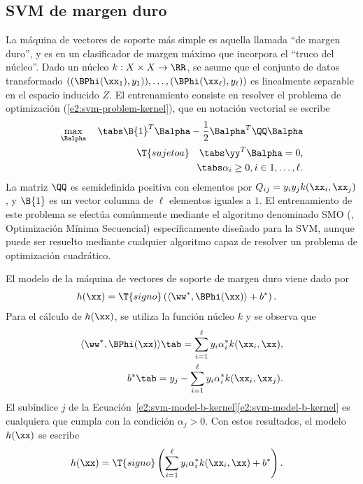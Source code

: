 %
%
\subsection{SVM de margen duro}
%
La máquina de vectores de soporte más simple es aquella llamada ``de
margen duro'', y es en un clasificador de margen máximo que incorpora
el ``truco del núcleo''. Dado un núcleo $k:X\times{}X\rightarrow\RR$,
se asume que el conjunto de datos transformado
$\left((\BPhi(\xx_1),y_1)),\ldots,(\BPhi(\xx_\ell),y_\ell)\right)$ es
linealmente separable en el espacio inducido $Z$.
El entrenamiento consiste en resolver el
problema de optimización (\ref{e2:svm-problem-kernel}), que en
notación vectorial se escribe
%
\begin{align}
  \label{e2:svm-hard-margin}
  \begin{split}
    \max_{\Balpha}\quad\tabs
      \B{1}^T\Balpha-\frac{1}{2}\Balpha^T\QQ\Balpha\\
    \T{sujeto a} \quad\tabs
      \yy^T\Balpha = 0, \\
      \tabs \alpha_i\geq 0,  i\in {1,\ldots,\ell }.
  \end{split}
\end{align}
%
La matriz $\QQ$ es semidefinida positiva con elementos por
$Q_{ij}=y_iy_jk(\xx_i,\xx_j)$, y $\B{1}$ es un vector columna de
$\ell$ elementos iguales a $1$.  El entrenamiento de este problema se
efectúa comúnmente mediante el algoritmo denominado SMO
(, Optimización Mínima
Secuencial) \cite{smo} específicamente diseñado para la SVM, aunque
puede ser resuelto mediante cualquier algoritmo capaz de resolver un
problema de optimización cuadrático.

El modelo de la máquina de vectores de soporte de margen
duro viene dado por
%
\begin{align}
  \begin{split}
    h(\xx) &= \T{signo}\left(\langle\ww^*,\BPhi(\xx)\rangle+b^*\right).
  \end{split}
\label{e2:svm-model-hard0}
\end{align}
%
Para el cálculo de $h(\xx)$, se utiliza la función núcleo $k$ y se
observa que
%
\begin{align}
  \langle\ww^*,\BPhi(\xx)\rangle \tab=
  \sum_{i=1}^\ell{}y_i\alpha^*_ik(\xx_i,\xx),\\
  b^* \tab= y_j - \sum_{i=1}^\ell{}y_i\alpha^*_ik(\xx_i,\xx_j).
  \label{e2:svm-model-b-kernel}
\end{align}
%
El subíndice $j$ de la
\iflatexml{}Ecuación~\ref{e2:svm-model-b-kernel}\else\autoref{e2:svm-model-b-kernel}\fi{}
es cualquiera que cumpla con la condición $\alpha_j>0$.  Con estos
resultados, el modelo $h(\xx)$ se escribe
%
\begin{align}
  h(\xx) &=
  \T{signo}\left(\sum_{i=1}^\ell{}y_i\alpha^*_ik(\xx_i,\xx)+b^*\right).
\label{e2:svm-model-hard}
\end{align}
%

